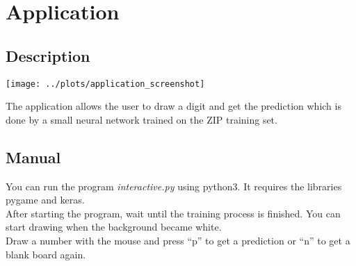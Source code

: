 
\section{Application}

\subsection{Description}

\texttt{[image: ../plots/application\_screenshot]}

The application allows the user to draw a digit and get the prediction
which is done by a small neural network trained on the ZIP training set.

\subsection{Manual}

You can run the program \textit{interactive.py} using python3.
It requires the libraries pygame and keras.\\

After starting the program, wait until the training process is finished.
You can start drawing when the background became white.\\
Draw a number with the mouse and press ``p'' to get a prediction or ``n'' to get a blank board again.